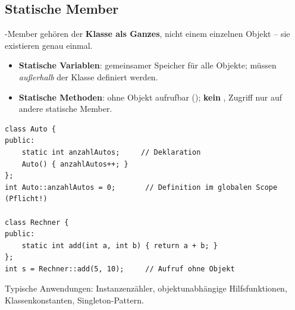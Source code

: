 \subsection{Statische Member}
-Member geh\"oren der \textbf{Klasse als Ganzes}, nicht einem einzelnen Objekt -- sie existieren genau einmal.
\begin{itemize}
  \item \textbf{Statische Variablen}: gemeinsamer Speicher f\"ur alle Objekte; m\"ussen \emph{au\ss erhalb} der Klasse definiert werden.
  \item \textbf{Statische Methoden}: ohne Objekt aufrufbar (); \textbf{kein }, Zugriff nur auf andere statische Member.
\end{itemize}
\begin{lstlisting}
class Auto {
public:
    static int anzahlAutos;     // Deklaration
    Auto() { anzahlAutos++; }
};
int Auto::anzahlAutos = 0;       // Definition im globalen Scope (Pflicht!)

class Rechner {
public:
    static int add(int a, int b) { return a + b; }
};
int s = Rechner::add(5, 10);     // Aufruf ohne Objekt
\end{lstlisting}
Typische Anwendungen: Instanzenz\"ahler, objektunabh\"angige Hilfsfunktionen, Klassenkonstanten, Singleton-Pattern.
\clearpage
